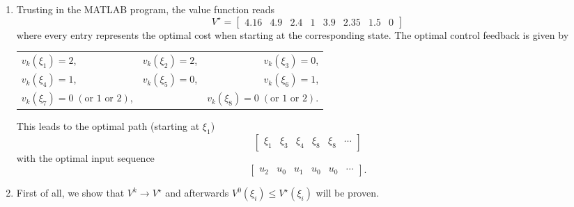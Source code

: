 \documentclass[12pt,pdftex,a4paper]{scrartcl}
\begin{document}
\begin{enumerate}
	\item Trusting in the MATLAB program, the value function reads
	\begin{equation*}
		V^\star =
		\begin{bmatrix}
			4.16 & 4.9 & 2.4 & 1 & 3.9 & 2.35 & 1.5 & 0 
		\end{bmatrix}
	\end{equation*}
	where every entry represents the optimal cost when starting at the corresponding state.	
	The optimal control feedback is given by
	\begin{center}
	\begin{tabular}{ l c r }
    $v_k(\xi_1) = 2$, & $v_k(\xi_2) = 2$, & $v_k(\xi_3) = 0$, \\
	$v_k(\xi_4) = 1$, & $v_k(\xi_5) = 0$, & $v_k(\xi_6) = 1$, \\
	$v_k(\xi_7) = 0 \; (\text{or } 1 \text{ or } 2)$, & & $v_k(\xi_8) = 0 \; (\text{or } 1 \text{ or } 2)$. \\
    \end{tabular}
	\end{center}
	This leads to the optimal path (starting at $\xi_1$)
	\begin{equation*}
		\begin{bmatrix}
			\xi_1 & \xi_3 & \xi_4 & \xi_8 & \xi_8 & \cdots
		\end{bmatrix}
	\end{equation*}
	with the optimal input sequence
	\begin{equation*}
		\begin{bmatrix}
			u_2 & u_0 & u_1 & u_0 & u_0 & \cdots
		\end{bmatrix}.
	\end{equation*}	
	
	\item First of all, we show that $V^k \rightarrow V^\star$ and afterwards $V^0(\xi_i) \le V^\star(\xi_i)$ will be proven. \\
	

\end{enumerate}
\end{document}

